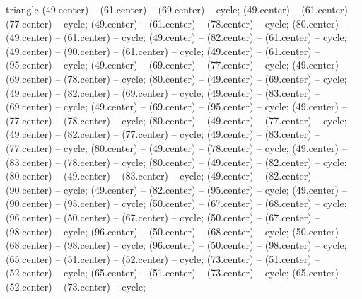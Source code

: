 \begin{pgfonlayer}{triangle}
 (49.center) -- (61.center) -- (69.center) -- cycle; 
 (49.center) -- (61.center) -- (77.center) -- cycle; 
 (49.center) -- (61.center) -- (78.center) -- cycle; 
 (80.center) -- (49.center) -- (61.center) -- cycle; 
 (49.center) -- (82.center) -- (61.center) -- cycle; 
 (49.center) -- (90.center) -- (61.center) -- cycle; 
 (49.center) -- (61.center) -- (95.center) -- cycle; 
 (49.center) -- (69.center) -- (77.center) -- cycle; 
 (49.center) -- (69.center) -- (78.center) -- cycle; 
 (80.center) -- (49.center) -- (69.center) -- cycle; 
 (49.center) -- (82.center) -- (69.center) -- cycle; 
 (49.center) -- (83.center) -- (69.center) -- cycle; 
 (49.center) -- (69.center) -- (95.center) -- cycle; 
 (49.center) -- (77.center) -- (78.center) -- cycle; 
 (80.center) -- (49.center) -- (77.center) -- cycle; 
 (49.center) -- (82.center) -- (77.center) -- cycle; 
 (49.center) -- (83.center) -- (77.center) -- cycle; 
 (80.center) -- (49.center) -- (78.center) -- cycle; 
 (49.center) -- (83.center) -- (78.center) -- cycle; 
 (80.center) -- (49.center) -- (82.center) -- cycle; 
 (80.center) -- (49.center) -- (83.center) -- cycle; 
 (49.center) -- (82.center) -- (90.center) -- cycle; 
 (49.center) -- (82.center) -- (95.center) -- cycle; 
 (49.center) -- (90.center) -- (95.center) -- cycle; 
 (50.center) -- (67.center) -- (68.center) -- cycle; 
 (96.center) -- (50.center) -- (67.center) -- cycle; 
 (50.center) -- (67.center) -- (98.center) -- cycle; 
 (96.center) -- (50.center) -- (68.center) -- cycle; 
 (50.center) -- (68.center) -- (98.center) -- cycle; 
 (96.center) -- (50.center) -- (98.center) -- cycle; 
 (65.center) -- (51.center) -- (52.center) -- cycle; 
 (73.center) -- (51.center) -- (52.center) -- cycle; 
 (65.center) -- (51.center) -- (73.center) -- cycle; 
 (65.center) -- (52.center) -- (73.center) -- cycle; 

\end{pgfonlayer}
